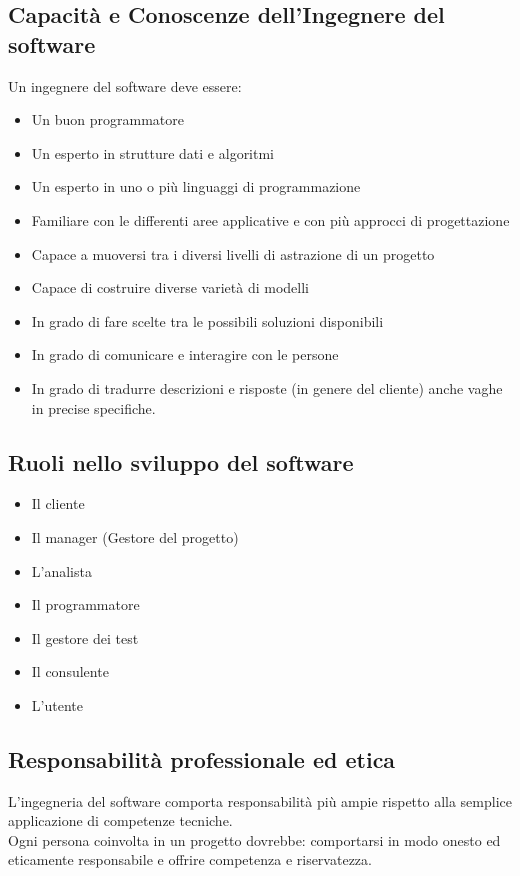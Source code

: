 \documentclass{article}
\begin{document}
	\subsection{Capacità e Conoscenze dell’Ingegnere del software}
	Un ingegnere del software deve essere: 
	\begin{itemize}
		\item Un buon programmatore
		\item Un esperto in strutture dati e algoritmi 
		\item Un esperto in uno o più linguaggi di programmazione
		\item Familiare con le differenti aree applicative e con più approcci di progettazione
		\item Capace a muoversi tra i diversi livelli di astrazione di un progetto
		\item Capace di costruire diverse varietà di modelli
		\item In grado di fare scelte tra le possibili soluzioni disponibili
		\item In grado di comunicare e interagire con le persone
		\item In grado di tradurre descrizioni e risposte (in genere del cliente) anche vaghe in precise specifiche.
	\end{itemize}
	\subsection{Ruoli nello sviluppo del software}
	\begin{itemize}
		\item Il cliente
		\item Il manager (Gestore del progetto)
		\item L'analista
		\item Il programmatore
		\item Il gestore dei test
		\item Il consulente
		\item L'utente
	\end{itemize}
	\subsection{Responsabilità professionale ed etica}
	L'ingegneria del software comporta responsabilità più ampie rispetto alla
	semplice applicazione di competenze tecniche.\\
	Ogni persona coinvolta in un progetto dovrebbe: comportarsi in modo onesto ed eticamente
	responsabile e offrire competenza e riservatezza.
\end{document}
